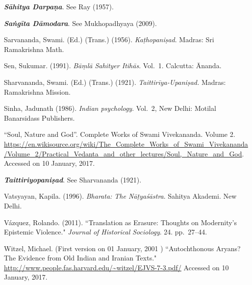 \begin{thebibliography}{99}
{\sl\bfseries Sāhitya Darpaṇa}. See Ray (1957).

{\sl\bfseries Saṅgīta Dāmodara}. See Mukhopadhyaya (2009).

Sarvananda, Swami. (Ed.) (Trans.) (1956). \textsl{Kaṭhopaniṣad}. Madras: Sri Ramakrishna Math.

Sen, Sukumar. (1991). \textsl{Bāṃlā Sahityer Itihās}. Vol.~1. Calcutta: Ānanda. 

Sharvananda, Swami. (Ed.) (Trans.) (1921). \textsl{Taittirīya-Upaniṣad.} Madras: Ramakrishna Mission.

Sinha, Jadunath (1986). \textsl{Indian psychology}. Vol.~2, New Delhi: Motilal Banarsidass Publishers.

“Soul, Nature and God”. Complete Works of Swami Vivekananda. Volume 2. \url{https://en.wikisource.org/wiki/The_Complete_Works_of_Swami_Vivekananda/Volume_2/Practical_Vedanta_and_other_lectures/Soul,_Nature_and_God}. Accessed on 10 January, 2017. 

{\sl\bfseries Taittiriyopaniṣad}. See Sharvananda (1921).

Vatsyayan, Kapila. (1996). \textsl{Bharata: The Nāṭyaśāstra}. Sahitya Akademi. New Delhi. 

Vázquez, Rolando. (2011). ``Translation as Erasure: Thoughts on Modernity's Epistemic Violence." \textsl{Journal of Historical Sociology}. 24. pp.~27--44.

Witzel, Michael. (First version on 01 January, 2001 ) ``Autochthonous Aryans? The Evidence from Old Indian and Iranian Texts." \url{http://www.people.fas.harvard.edu/~witzel/EJVS-7-3.pdf/} Accessed on 10 January, 2017. 
\end{thebibliography}

\label{chapter\thechapter:end}
